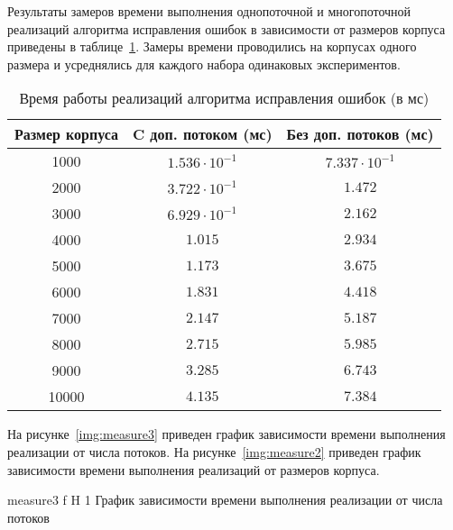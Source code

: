 \clearpage

Результаты замеров времени выполнения однопоточной и многопоточной реализаций алгоритма исправления ошибок в зависимости от размеров корпуса приведены в таблице~\ref{tbl:time_measurements2}. Замеры времени проводились на корпусах одного размера и усреднялись для каждого набора одинаковых экспериментов.


\begin{table}[H]
	\begin{center}
		\begin{threeparttable}
			\captionsetup{justification=raggedright,singlelinecheck=off}
			\caption{Время работы реализаций алгоритма исправления ошибок (в мс)}
			\label{tbl:time_measurements2}
			\begin{tabular}{|c|c|c|}
				\hline
				Размер корпуса &  C доп. потоком (мс) & Без доп. потоков (мс)\\
				\hline
			1000 &$ 1.536\cdot 10^{-1} $&$ 7.337\cdot 10^{-1}$\\
			\hline
			2000 &$ 3.722\cdot 10^{-1} $&$ 1.472$\\
			\hline
			3000 &$ 6.929\cdot 10^{-1} $&$ 2.162$\\
			\hline
			4000 &$ 1.015 $&$ 2.934$\\
			\hline
			5000 &$ 1.173 $&$ 3.675$\\
			\hline
			6000 &$ 1.831 $&$ 4.418$\\
			\hline
			7000 &$ 2.147 $&$ 5.187$\\
			\hline
			8000 &$ 2.715 $&$ 5.985$\\
			\hline
			9000 &$ 3.285 $&$ 6.743$\\
			\hline
			10000 &$ 4.135 $&$ 7.384$\\
			\hline
				
			\end{tabular}
		\end{threeparttable}
	\end{center}
\end{table}

На рисунке~\ref{img:measure3} приведен график зависимости времени выполнения реализации от числа потоков. На рисунке~\ref{img:measure2} приведен график зависимости времени выполнения реализаций от размеров корпуса.  

{measure3} %
{f} %
{H} %
{1\textwidth} %
{График зависимости времени выполнения реализации от числа потоков} %


